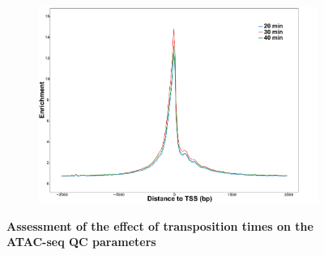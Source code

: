 \begin{figure}[htbp]
\begin{subfigure}{0.5\textwidth}
\caption{\textbf{}}
\end{subfigure} \\
\begin{subfigure}{0.5\textwidth}
\centering
\includegraphics[width=\textwidth]{./Results1/pdfs/ATAC_optimisation_CD4_20_30_40_min_tss_enrichment}
\caption{\textbf{}} %
\end{subfigure}
\caption[Assessment of the effect of transposition times on the ATAC-seq QC parameters]{\textbf{Assessment of the effect of transposition times on the ATAC-seq QC parameters} \\
}
\label{fig:Transposition_times_ATAC}
\end{figure} 



